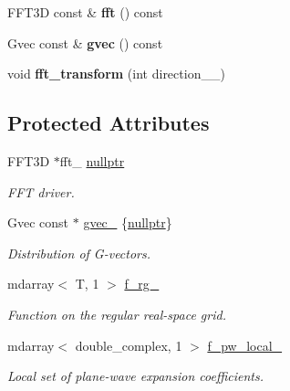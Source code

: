 \begin{DoxyCompactItemize}
\item 
\hypertarget{classsirius_1_1_smooth__periodic__function_ac760b5f8cc33fa5d15086ebdf8d416ec}{}F\+F\+T3\+D const \& {\bfseries fft} () const \label{classsirius_1_1_smooth__periodic__function_ac760b5f8cc33fa5d15086ebdf8d416ec}

\item 
\hypertarget{classsirius_1_1_smooth__periodic__function_a0d75bd85e2ba08c664cf77de6462fb69}{}Gvec const \& {\bfseries gvec} () const \label{classsirius_1_1_smooth__periodic__function_a0d75bd85e2ba08c664cf77de6462fb69}

\item 
\hypertarget{classsirius_1_1_smooth__periodic__function_ac3bd4fd6e700886626e20563c8c82b9a}{}void {\bfseries fft\+\_\+transform} (int direction\+\_\+\+\_\+)\label{classsirius_1_1_smooth__periodic__function_ac3bd4fd6e700886626e20563c8c82b9a}

\end{DoxyCompactItemize}
\subsection*{Protected Attributes}
\begin{DoxyCompactItemize}
\item 
F\+F\+T3\+D $\ast$fft\+\_\+ \hyperlink{classsirius_1_1_smooth__periodic__function_a12dde4e253178aa9cb2e00df22e9eac9}{nullptr}
\begin{DoxyCompactList}\small\item\em F\+F\+T driver. \end{DoxyCompactList}\item 
Gvec const $\ast$ \hyperlink{classsirius_1_1_smooth__periodic__function_a012ad2f87eaeadd3228e650bdd96c5fc}{gvec\+\_\+} \{\hyperlink{classsirius_1_1_smooth__periodic__function_a12dde4e253178aa9cb2e00df22e9eac9}{nullptr}\}
\begin{DoxyCompactList}\small\item\em Distribution of G-\/vectors. \end{DoxyCompactList}\item 
mdarray$<$ T, 1 $>$ \hyperlink{classsirius_1_1_smooth__periodic__function_a282f1e59f9ae5bf4e4e88c507b036eb0}{f\+\_\+rg\+\_\+}
\begin{DoxyCompactList}\small\item\em Function on the regular real-\/space grid. \end{DoxyCompactList}\item 
mdarray$<$ double\+\_\+complex, 1 $>$ \hyperlink{classsirius_1_1_smooth__periodic__function_acf70e39f87e7a5e51a32a98e2e328c9b}{f\+\_\+pw\+\_\+local\+\_\+}
\begin{DoxyCompactList}\small\item\em Local set of plane-\/wave expansion coefficients. \end{DoxyCompactList}\end{DoxyCompactItemize}


